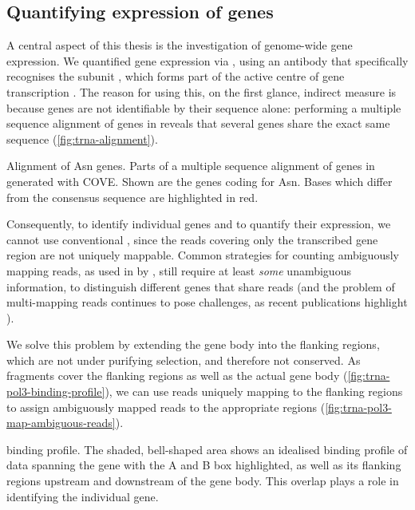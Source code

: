 \subsection{Quantifying expression of  genes}

A central aspect of this thesis is the investigation of genome-wide \trna gene
expression. We quantified \trna gene expression via  \chipseq, using an
antibody that specifically recognises the  subunit , which
forms part of the active centre of \trna gene transcription
\citep{Ablasser:2009}. The reason for using this, on the first glance, indirect
measure is because \trna genes are not identifiable by their sequence alone:
performing a multiple sequence alignment of \trna genes in \mmu reveals that
several \trna genes share the exact same sequence (\cref{fig:trna-alignment}).

    {\ifoddpage\else\raggedleft\fi%
    \small}
    {Alignment of Asn \trna genes.}
    {Parts of a multiple sequence alignment of \trna genes in \mmu generated
    with COVE\@. Shown are the \trna genes coding for Asn. Bases which differ
    from the consensus sequence are highlighted in red.}

Consequently, to identify individual \trna genes and to quantify their
expression, we cannot use conventional \rnaseq, since the \rna reads covering
only the transcribed gene region are not uniquely mappable. Common strategies
for counting ambiguously mapping reads, as used in  by
\citet{Mortazavi:2008}, still require at least \emph{some} unambiguous
information, to distinguish different genes that share reads (and the problem of
multi-mapping reads continues to pose challenges, as recent publications
highlight \citep{Kahles:2015}).

We solve this problem by extending the \trna gene body into the flanking
regions, which are not under purifying selection, and therefore not conserved.
As  \chipseq fragments cover the flanking regions as well as the actual
gene body (\cref{fig:trna-pol3-binding-profile}), we can use reads uniquely
mapping to the flanking regions to assign ambiguously mapped reads to the
appropriate regions (\cref{fig:trna-pol3-map-ambiguous-reads}).

    {\trna {} \chip binding profile.}
    {The shaded, bell-shaped area shows an idealised binding profile of \chipseq
    data spanning the \trna gene with the A and B box highlighted, as well as
    its flanking regions upstream and downstream of the gene body. This overlap
    plays a role in identifying the individual gene.}

